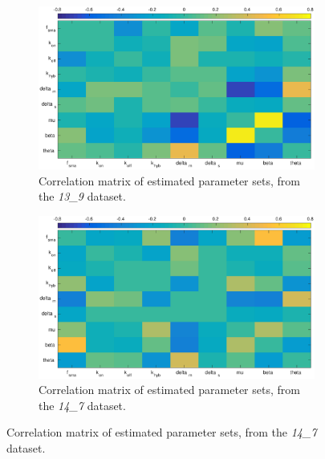 \documentclass[10pt,journal]{./IEEE_latex_class/IEEEtran}
\begin{document}
\begin{figure}[H]
    \begin{subfigure}[c]{0.49\textwidth}
        \centering
    \includegraphics[scale = 0.235, clip = true, trim = 120 0 65 0]{13_9_heatmap.eps}
        \caption{Correlation matrix of estimated parameter sets, from the  \textit{13\_9} dataset. }
        \label{InitialResults_13_9_correlation}
    \end{subfigure}
    \begin{subfigure}[c]{0.49\textwidth}
    \centering
        \includegraphics[scale = 0.235, clip = true, trim = 80 0 70 0]{14_7_heatmap.eps}
        \caption{Correlation matrix of estimated parameter sets, from the  \textit{14\_7} dataset.}
        \label{InitialResults_14_7_correlation}
    \end{subfigure} 
    

\end{figure}
\end{document}
